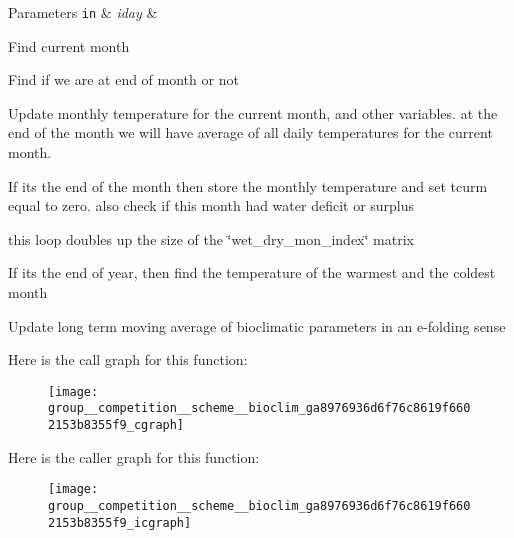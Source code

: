 \begin{DoxyParams}[1]{Parameters}
\mbox{\tt in}  & {\em iday} & \\
\hline
\end{DoxyParams}
Find current month

Find if we are at end of month or not

Update monthly temperature for the current month, and other variables. at the end of the month we will have average of all daily temperatures for the current month.

If its the end of the month then store the monthly temperature and set tcurm equal to zero. also check if this month had water deficit or surplus

this loop doubles up the size of the \char`\"{}wet\+\_\+dry\+\_\+mon\+\_\+index\char`\"{} matrix

If its the end of year, then find the temperature of the warmest and the coldest month

Update long term moving average of bioclimatic parameters in an e-\/folding sense 

Here is the call graph for this function\+:\nopagebreak
\begin{figure}[H]
\begin{center}
\leavevmode
\texttt{[image: group\_\_competition\_\_scheme\_\_bioclim\_ga8976936d6f76c8619f6602153b8355f9\_cgraph]}
\end{center}
\end{figure}




Here is the caller graph for this function\+:\nopagebreak
\begin{figure}[H]
\begin{center}
\leavevmode
\texttt{[image: group\_\_competition\_\_scheme\_\_bioclim\_ga8976936d6f76c8619f6602153b8355f9\_icgraph]}
\end{center}
\end{figure}


